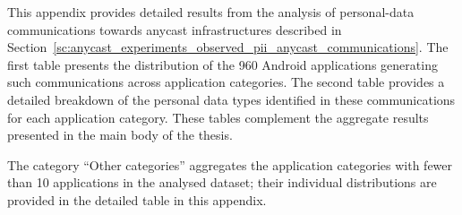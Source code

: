 \documentclass[
A4paper,                %
twoside,                %
openright,              %
chapterprefix=true,     %
12pt,                   %
headings=normal,        %
titlepage=on            %
]{book}
\begin{document}
This appendix provides detailed results from the analysis of personal-data communications towards anycast infrastructures described in Section~\ref{sc:anycast_experiments_observed_pii_anycast_communications}. The first table presents the distribution of the 960 Android applications generating such communications across application categories. The second table provides a detailed breakdown of the personal data types identified in these communications for each application category. These tables complement the aggregate results presented in the main body of the thesis.

The category ``Other categories'' aggregates the application categories with fewer than 10 applications in the analysed dataset; their individual distributions are provided in the detailed table in this appendix.
\end{document}

